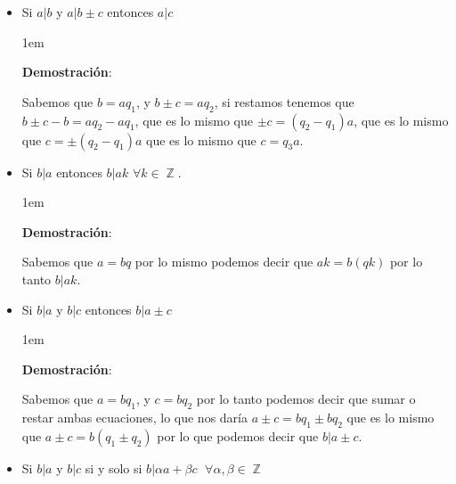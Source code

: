 \documentclass[12pt, fleqn]{report}                             %
\newenvironment{SmallIndentation}[1][0.75em]                    %
    {\begin{adjustwidth}{#1}{}\begin{footnotesize}}                 %
    {\end{footnotesize}\end{adjustwidth}}                           %
\DeclareMathOperator \Integers  {\mathbb{Z}}                     %
\begin{document}
\begin{itemize}
                \clearpage

                \item Si $a|b$ y $a|b \pm c$ entonces $a|c$

                    \begin{SmallIndentation}[1em]
                        \textbf{Demostración}:

                        Sabemos que $b=aq_1$, y $b \pm c=aq_2$, si restamos tenemos que
                        $b \pm c -b = aq_2 - aq_1$, que es lo mismo que $\pm c = (q_2-q_1)a$,
                        que es lo mismo que $c = \pm(q_2-q_1)a$ que es lo mismo que $c = q_3a$.

                    \end{SmallIndentation}



                \item Si $b|a$ entonces $b|ak$ $\forall k \in \Integers$.

                    \begin{SmallIndentation}[1em]
                        \textbf{Demostración}:

                        Sabemos que $a=bq$ por lo mismo podemos decir que
                        $ak=b(qk)$ por lo tanto $b|ak$.

                    \end{SmallIndentation}
                    


                \item Si $b|a$ y $b|c$ entonces $b|a \pm c$

                    \begin{SmallIndentation}[1em]
                        \textbf{Demostración}:

                        Sabemos que $a=bq_1$, y $c=bq_2$ por lo tanto podemos decir que
                        sumar o restar ambas ecuaciones, lo que nos daría
                        $a \pm c = bq_1 \pm bq_2$ que es lo mismo que
                        $a \pm c = b (q_1 \pm q_2)$ por lo que podemos decir que $b|a \pm c$.

                    \end{SmallIndentation}

                \item Si $b|a$ y $b|c$ si y solo si $b|\alpha a + \beta c$ $\; \forall \alpha, \beta \in \Integers$ 


\end{itemize}
\end{document}
